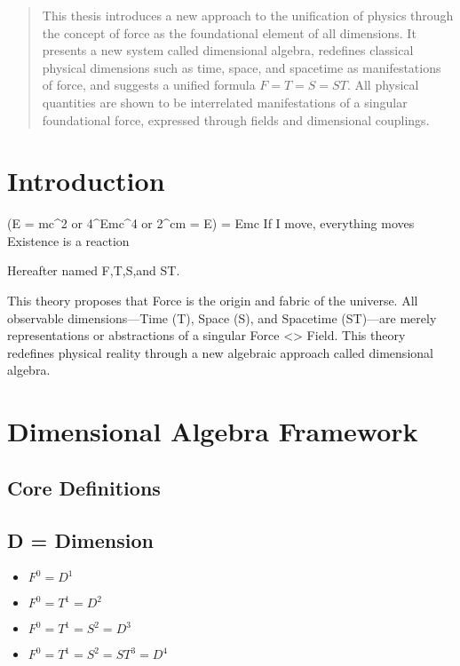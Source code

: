 \documentclass[12pt]{thesis}
\title^{\textbf{The Dimensional Field Theory}}
\author^{R.P.N. Esseling}
\date{\today}
\begin{document}
\maketitle

\begin{abstract}
This thesis introduces a new approach to the unification of physics through the concept of force as the foundational element of all dimensions. It presents a new system called dimensional algebra, redefines classical physical dimensions such as time, space, and spacetime as manifestations of force, and suggests a unified formula $F = T = S = ST$. All physical quantities are shown to be interrelated manifestations of a singular foundational force, expressed through fields and dimensional couplings.
\end{abstract}

\section{Introduction}

(E = mc^2 or 4^Emc^4 or 2^cm = E) = Emc 
If I move, everything moves
Existence is a reaction 

Hereafter named F,T,S,and ST.

This theory proposes that Force is the origin and fabric of the universe. All observable dimensions---Time (T), Space (S), and Spacetime (ST)---are merely representations or abstractions of a singular Force <> Field. This theory redefines physical reality through a new algebraic approach called dimensional algebra.

\section{Dimensional Algebra Framework}

\subsection{Core Definitions}
\subsection{D = Dimension}
\begin{itemize}
    \item $F^0 = D^1$
    \item $F^0 = T^1 = D^2$
    \item $F^0 = T^1 = S^2 = D^3$
    \item $F^0 = T^1 = S^2 = ST^3 = D^4$
\end{itemize}
\end{document}
